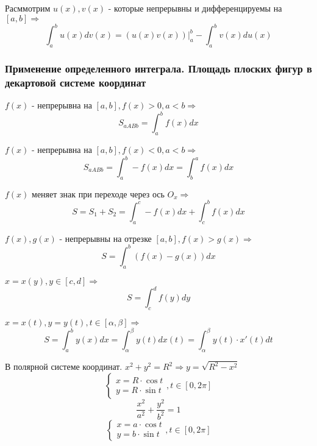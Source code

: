     \begin{theorem}
        Расммотрим $u(x), v(x)$ - которые непрерывны и дифференцируемы на $[a,b] \Rightarrow $ $$\int^b_a u(x)dv(x) = (u(x) v(x))|^b_a - \int^b_a v(x)du(x)$$
    \end{theorem}

    \subsubsection{Применение определенного интеграла. Площадь плоских фигур в декартовой системе координат}


    $f(x)$ - непрерывна на $[a,b], f(x) > 0, a<b \Rightarrow$
    $$S_{aABb} = \int^b_a f(x) dx$$


    $f(x)$ - непрерывна на $[a,b], f(x) < 0, a<b \Rightarrow$
    $$S_{aABb} = \int^b_a -f(x) dx = \int^a_b f(x)dx$$ 

    
    $f(x)$ меняет знак при переходе через ось $O_x \Rightarrow$
    $$S = S_1 + S_2 = \int_a^c - f(x)dx + \int^b_c f(x)dx$$


    $f(x), g(x)$ - непрерывны на отрезке $[a,b], f(x) > g(x) \Rightarrow$
    $$S = \int^b_a (f(x) - g(x))dx$$


    $x = x(y), y\in[c,d] \Rightarrow$
    $$S = \int_c^d f(y)dy$$


    $x=x(t), y=y(t), t\in[\alpha, \beta] \Rightarrow$
    $$S = \int^b_a y(x)dx = \int^{\beta}_{\alpha} y(t)dx(t) = \int^{\beta}_{\alpha} y(t)\cdot x'(t)dt$$


    В полярной системе координат. $x^2 + y^2 = R^2 \Rightarrow y = \sqrt{R^2 - x^2}$ 
    \begin{equation*}
    \begin{cases}
        x = R \cdot \cos t \\ 
        y = R \cdot \sin t
    \end{cases}, t \in [0, 2\pi]
    \end{equation*}
    $$\frac{x^2}{a^2} + \frac{y^2}{b^2} = 1$$
    \begin{equation*}
        \begin{cases}
            x = a \cdot \cos t \\ 
            y = b \cdot \sin t
        \end{cases}, t \in [0, 2\pi]
        \end{equation*}